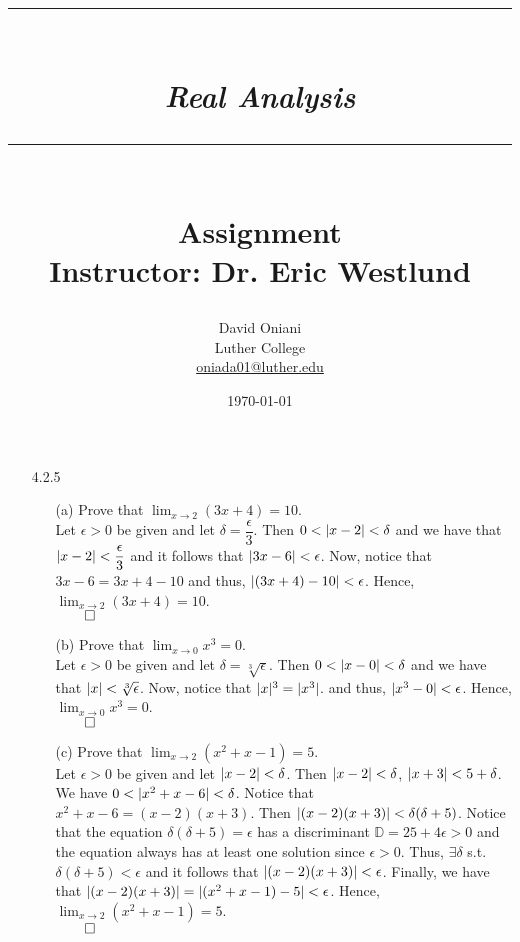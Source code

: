\documentclass[11pt]{article}
\author{David Oniani\\
        Luther College\\
        \href{mailto:oniada01@luther.edu}{oniada01@luther.edu}}
\title{\rule{\paperwidth - 150pt}{1pt}\textbf{\\\textit{Real Analysis}\\}\rule
{\paperwidth - 150pt}{1pt}\\\textbf{Assignment \textnumero7}\\{\normalsize
Instructor: Dr. Eric Westlund}}
\date{\today}
\DeclarePairedDelimiter\abs{\lvert}{\rvert}%
\begin{document}
\maketitle

%
%
%

\begin{itemize}
    \item[]

    \item[]

    \item[4.2.5]
        \begin{itemize}
            \item[(a)]
                Prove that $\lim_{x \to 2} (3x + 4) = 10$.
                \\
                Let $\epsilon > 0$ be given and let $\delta =
                \dfrac{\epsilon}{3}$. Then $0 < \abs{x - 2} < \delta$ and we
                have that $\abs{x - 2} < \dfrac{\epsilon}{3}$ and it follows
                that $\abs{3x - 6} < \epsilon$. Now, notice that $3x - 6 = 3x +
                4 - 10$ and thus, $\abs{(3x + 4) - 10} < \epsilon$. Hence,
                $\lim_{x \to 2} (3x + 4) = 10$.\\
                $\qed$

            \item[(b)]
                Prove that $\lim_{x \to 0} x^3 = 0$.
                \\
                Let $\epsilon > 0$ be given and let $\delta =
                \sqrt[3]{\epsilon}$. Then $0 < \abs{x - 0} < \delta$ and we
                have that $\abs{x} < \sqrt[3]{\epsilon}$. Now, notice that
                $\abs{x}^3 = \abs{x^3}$.  and thus, $\abs{x^3 - 0} < \epsilon$.
                Hence, $\lim_{x \to 0} x^3 = 0$.\\
                $\qed$

            \item[(c)]
                Prove that $\lim_{x \to 2} (x^2 + x - 1) = 5$.
                \\
                Let $\epsilon > 0$ be given and let $\abs{x - 2} < \delta$.
                Then $\abs{x - 2} < \delta$, $\abs{x + 3} < 5 + \delta$. We
                have $0 < \abs{x^2 + x - 6} < \delta$. Notice that $x^2 + x - 6
                = (x - 2)(x + 3)$. Then $\abs{(x - 2)(x + 3)} < \delta(\delta +
                5)$.  Notice that the equation $\delta(\delta + 5) = \epsilon$
                has a discriminant $\mathbb{D} = 25 + 4\epsilon > 0$ and the
                equation always has at least one solution since $\epsilon > 0$.
                Thus, $\exists \delta$ s.t. $\delta(\delta + 5) < \epsilon$ and
                it follows that $\abs{(x - 2)(x + 3)} < \epsilon$. Finally, we
                have that $\abs{(x - 2)(x + 3)} = \abs{(x^2 + x - 1) - 5} <
                \epsilon$.  Hence, $\lim_{x \to 2} (x^2 + x - 1) = 5$.\\
                $\qed$


\end{itemize}
\end{itemize}
\end{document}
